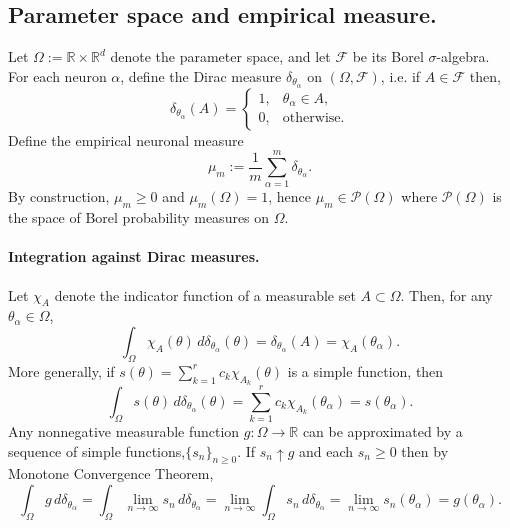 \subsection{Parameter space and empirical measure.}
Let $\Omega := \mathbb{R} \times \mathbb{R}^d$
denote the parameter space, and let $\mathcal{F}$ be its Borel $\sigma$-algebra.
For each neuron $\alpha$, define the Dirac measure $\delta_{\theta_\alpha}$ on
$(\Omega,\mathcal{F})$, i.e. if $A \in \mathcal{F}$ then,
\[
	\delta_{\theta_\alpha}(A)
	=
	\begin{cases}
		1, & \theta_\alpha \in A, \\
		0, & \text{otherwise}.
	\end{cases}
\]
Define the empirical neuronal measure
\begin{equation}
	\mu_m := \frac{1}{m}\sum_{\alpha=1}^m \delta_{\theta_\alpha}.
	\label{eq:empirical-measure}
\end{equation}
By construction, $\mu_m \ge 0$ and  $\mu_m(\Omega)=1$, hence $\mu_m \in
	\mathcal P(\Omega)$ where $\mathcal P(\Omega)$ is the space of Borel
probability measures on $\Omega$.

\paragraph{Integration against Dirac measures.}
Let $\chi_A$ denote the indicator function of a measurable set $A \subset \Omega$.
Then, for any $\theta_\alpha \in \Omega$,
\[
	\int_\Omega \chi_A(\theta)\,d\delta_{\theta_\alpha}(\theta)
	=
	\delta_{\theta_\alpha}(A)
	=
	\chi_A(\theta_\alpha).
\]
More generally, if $s(\theta) = \sum_{k=1}^r c_k \chi_{A_k}(\theta)$ is a simple
function, then
\[
	\int_\Omega s(\theta)\,d\delta_{\theta_\alpha}(\theta)
	=
	\sum_{k=1}^r c_k \chi_{A_k}(\theta_\alpha)
	=
	s(\theta_\alpha).
\]
Any nonnegative measurable function $g : \Omega \to \mathbb{R}$ can be approximated by
a sequence of simple functions,$\{s_n\}_{n\ge 0}$. If $s_n \uparrow g$ and each $s_n \ge 0$ then
by Monotone Convergence Theorem,
\begin{equation}
	\int_\Omega g\,d\delta_{\theta_\alpha}
	= \int_\Omega \lim_{n \to \infty} s_n\,d\delta_{\theta_\alpha}
	=  \lim_{n \to \infty} \int_\Omega s_n\,d\delta_{\theta_\alpha}
	=  \lim_{n \to \infty} s_n(\theta_\alpha)
	= g(\theta_\alpha).
	\label{eq:dirac-integration}
\end{equation}

